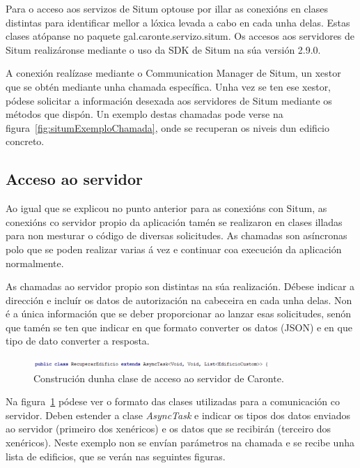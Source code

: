 Para o acceso aos servizos de Situm optouse por illar as conexións en clases distintas para identificar mellor a lóxica levada a cabo en cada unha delas. Estas clases atópanse no paquete gal.caronte.servizo.situm. Os accesos aos servidores de Situm realizáronse mediante o uso da SDK de Situm na súa versión 2.9.0.

A conexión realízase mediante o Communication Manager de Situm, un xestor que se obtén mediante unha chamada específica. Unha vez se ten ese xestor, pódese solicitar a información desexada aos servidores de Situm mediante os métodos que dispón. Un exemplo destas chamadas pode verse na figura~\ref{fig:situmExemploChamada}, onde se recuperan os niveis dun edificio concreto.


\subsection{Acceso ao servidor}
Ao igual que se explicou no punto anterior para as conexións con Situm, as conexións co servidor propio da aplicación tamén se realizaron en clases illadas para non mesturar o código de diversas solicitudes. As chamadas son asíncronas polo que se poden realizar varias á vez e continuar coa execución da aplicación normalmente.

As chamadas ao servidor propio son distintas na súa realización. Débese indicar a dirección e incluír os datos de autorización na cabeceira en cada unha delas. Non é a única información que se deber proporcionar ao lanzar esas solicitudes, senón que tamén se ten que indicar en que formato converter os datos (JSON) e en que tipo de dato converter a resposta.

\begin{figure}[htb] 
	\begin{center}
		\includegraphics[width=0.8\textwidth]{figures/codigo/chamadaServidorDefinicion}
		\caption{Construción dunha clase de acceso ao servidor de Caronte.}
		\label{fig:chamadaServidorDefinicion}
	\end{center}
\end{figure}

Na figura~\ref{fig:chamadaServidorDefinicion} pódese ver o formato das clases utilizadas para a comunicación co servidor. Deben estender a clase \emph{AsyncTask} e indicar os tipos dos datos enviados ao servidor (primeiro dos xenéricos) e os datos que se recibirán (terceiro dos xenéricos). Neste exemplo non se envían parámetros na chamada e se recibe unha lista de edificios, que se verán nas seguintes figuras.


